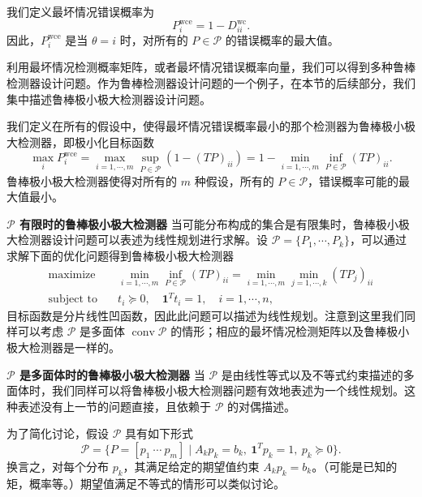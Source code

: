 \documentclass[UTF8,12pt,a4paper,fontset=fandol]{ctexart}
\begin{document}
我们定义最坏情况错误概率为
\[
P_i^{\mathrm{wce}}=1-D_{ii}^{\mathrm{wc}}.
\]
因此，$P_i^{\mathrm{wce}}$ 是当 $\theta=i$ 时，对所有的 $P\in\mathcal{P}$ 的错误概率的最大值。

利用最坏情况检测概率矩阵，或者最坏情况错误概率向量，我们可以得到多种鲁棒检测器设计问题。作为鲁棒检测器设计问题的一个例子，在本节的后续部分，我们集中描述鲁棒极小极大检测器设计问题。

我们定义在所有的假设中，使得最坏情况错误概率最小的那个检测器为鲁棒极小极大检测器，即极小化目标函数
\[
\max_i P_i^{\mathrm{wce}}=\max_{i=1,\cdots,m}\sup_{P\in\mathcal{P}}(1-(TP)_{ii})
=1-\min_{i=1,\cdots,m}\inf_{P\in\mathcal{P}}(TP)_{ii}.
\]
鲁棒极小极大检测器使得对所有的 $m$ 种假设，所有的 $P\in\mathcal{P}$，错误概率可能的最大值最小。

\noindent\textbf{$\mathcal{P}$ 有限时的鲁棒极小极大检测器}\quad
当可能分布构成的集合是有限集时，鲁棒极小极大检测器设计问题可以表述为线性规划进行求解。设 $\mathcal{P}=\{P_1,\cdots,P_k\}$，可以通过求解下面的优化问题得到鲁棒极小极大检测器
\[
\begin{aligned}
\text{maximize}\quad & \min_{i=1,\cdots,m}\inf_{P\in\mathcal{P}}(TP)_{ii}
=\min_{i=1,\cdots,m}\min_{j=1,\cdots,k}(TP_j)_{ii}\\
\text{subject to}\quad & t_i\succeq 0,\quad \mathbf{1}^Tt_i=1,\quad i=1,\cdots,n,
\end{aligned}
\]
目标函数是分片线性凹函数，因此此问题可以描述为线性规划。注意到这里我们同样可以考虑 $\mathcal{P}$ 是多面体 $\operatorname{conv}\mathcal{P}$ 的情形；相应的最坏情况检测矩阵以及鲁棒极小极大检测器是一样的。

\noindent\textbf{$\mathcal{P}$ 是多面体时的鲁棒极小极大检测器}\quad
当 $\mathcal{P}$ 是由线性等式以及不等式约束描述的多面体时，我们同样可以将鲁棒极小极大检测器问题有效地表述为一个线性规划。这种表述没有上一节的问题直接，且依赖于 $\mathcal{P}$ 的对偶描述。

为了简化讨论，假设 $\mathcal{P}$ 具有如下形式
\begin{equation}
\mathcal{P}=\{P=[p_1\ \cdots\ p_m]\mid A_kp_k=b_k,\ \mathbf{1}^Tp_k=1,\ p_k\succeq 0\}.
\tag{7.16}
\end{equation}
换言之，对每个分布 $p_k$，其满足给定的期望值约束 $A_kp_k=b_k$。（可能是已知的矩，概率等。）期望值满足不等式的情形可以类似讨论。
\end{document}
